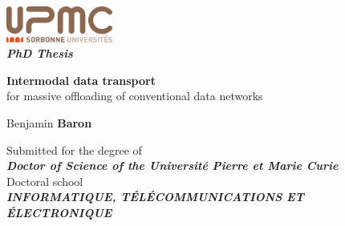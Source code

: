 \pagestyle{empty}
 
\begingroup
  \setlength{\parindent}{0pt}
  \setlength{\parskip}{6pt}
  \setlength{\leftskip}{15pt}
  \linespread{1.1}
    {\begingroup %
    \raggedleft %
    \vspace*{\baselineskip} %
    {\Large {\includegraphics[width=3.5cm]{figures/upmc.pdf}}}\\[0.167\textheight]
    
    {\LARGE\bfseries\itshape {PhD Thesis}}\\[\baselineskip] %
    \begin{adjustwidth}{4cm}{0cm}
        \raggedleft
        \textcolor{partcolor}{\Huge \textsf{\textbf{Intermodal data transport}\protect\\ for massive offloading of conventional data networks}}
    \end{adjustwidth}
    
    {\Large \textsf{Benjamin \textbf{Baron}}}\par %
    
    \vfill %
    \begin{center}
	    {Submitted for the degree of}\\[1mm]
	    {\large\bfseries\itshape Doctor of Science of the Université Pierre et Marie Curie}\\[3mm]
	    {Doctoral school}\\[1mm]
			{\large\bfseries\itshape INFORMATIQUE, TÉLÉCOMMUNICATIONS ET ÉLECTRONIQUE}
			

\end{center}}

